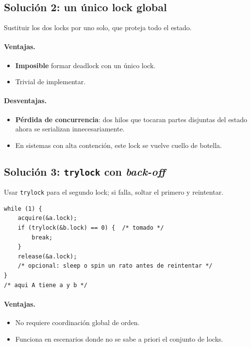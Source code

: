 \documentclass[11pt,a4paper]{article}
\begin{document}
\subsection*{Solución 2: un único lock global}

Sustituir los dos locks por uno solo, que proteja todo el estado.

\paragraph{Ventajas.}
\begin{itemize}[leftmargin=*,nosep]
    \item \textbf{Imposible} formar deadlock con un único lock.
    \item Trivial de implementar.
\end{itemize}

\paragraph{Desventajas.}
\begin{itemize}[leftmargin=*,nosep]
    \item \textbf{Pérdida de concurrencia}: dos hilos que tocaran
        partes disjuntas del estado ahora se serializan
        innecesariamente.
    \item En sistemas con alta contención, este lock se vuelve
        cuello de botella.
\end{itemize}

\subsection*{Solución 3: \texttt{trylock} con \emph{back-off}}

Usar \texttt{trylock} para el segundo lock; si falla, soltar el
primero y reintentar.

\begin{lstlisting}[style=cstyle]
while (1) {
    acquire(&a.lock);
    if (trylock(&b.lock) == 0) {  /* tomado */
        break;
    }
    release(&a.lock);
    /* opcional: sleep o spin un rato antes de reintentar */
}
/* aqui A tiene a y b */
\end{lstlisting}

\paragraph{Ventajas.}
\begin{itemize}[leftmargin=*,nosep]
    \item No requiere coordinación global de orden.
    \item Funciona en escenarios donde no se sabe a priori el
        conjunto de locks.
\end{itemize}
\end{document}

